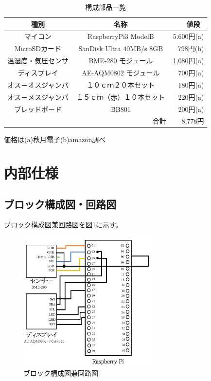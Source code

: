 \documentclass{jsarticle}
\begin{document}
			\begin{center}
				\begin{table}[H]
				  \centering
				  \caption{構成部品一覧}
				  \begin{tabular}{|c|c|r|} \hline
				    種別 & 名称 & 値段\ 　 \\ \hline \hline
				    マイコン & RaspberryPi3 ModelB & 5.600円(a) \\
				    MicroSDカード & SanDisk Ultra 40MB/s 8GB & 798円(b) \\
				    温湿度・気圧センサ & BME-280 モジュール & 1,080円(a) \\
				    ディスプレイ & AE-AQM0802 モジュール & 700円(a) \\
				    オス－オスジャンパ & １０ｃｍ２０本セット & 180円(a) \\
				    オス－メスジャンパ & １５ｃｍ（赤）１０本セット & 220円(a) \\
				    ブレッドボード & BB801 & 200円(a) \\ \hline \hline
				     &  　　　　　　　　　　　    合計 & 8,778円 \\ \hline
				  \end{tabular}
				\end{table}
				{\scriptsize 価格は(a)秋月電子(b)amazon調べ}
			\end{center}
		
		\section{内部仕様}
		
			\subsection{ブロック構成図・回路図}
			
				ブロック構成図兼回路図を図\ref{fig:circuit}に示す。
			
				\begin{figure}[htbp]
				  \begin{center}
				    \includegraphics[clip,width=7.0cm]{img/circuit}
				    \caption{ブロック構成図兼回路図}
				    \label{fig:circuit}
				  \end{center}
				\end{figure}
				
\end{document}
